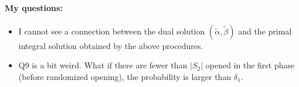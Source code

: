 \documentclass{article}
\begin{document}
\paragraph{My questions:}


\begin{itemize}
\item I cannot see a connection between the dual solution $(\tilde{\alpha}, \tilde{\beta})$ and the primal integral solution obtained by the above procedures.
\item Q9 is a bit weird. What if there are fewer than $|S_2|$ opened in the first phase (before randomized opening), the probability is larger than $\delta_1$. 
\end{itemize}
\end{document}
